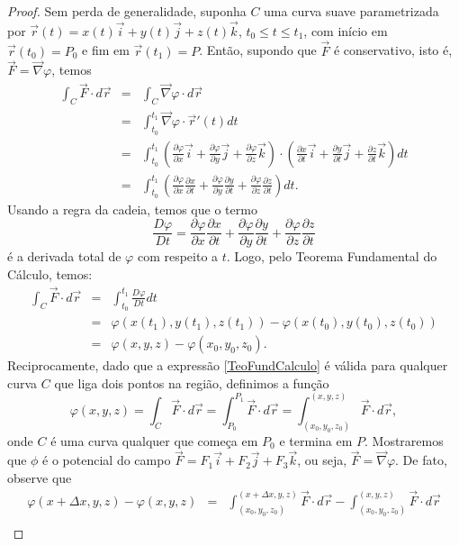 \begin{proof}
Sem perda de generalidade, suponha $C$ uma curva suave parametrizada por $\vec{r}(t)=x(t)\vec{i}+y(t)\vec{j}+z(t)\vec{k}$, $t_0\leq t\leq t_1$, com início em $\vec{r}(t_0)=P_0$ e fim em $\vec{r}(t_1)=P$. Então, supondo que $\vec{F}$ é conservativo, isto é, $\vec{F}=\vec{\nabla}\varphi$, temos
\begin{eqnarray*}
\int_C\vec{F}\cdot d \vec{r} &=& \int_C\vec{\nabla}\varphi\cdot d \vec{r}\\
&=& \int_{t_0}^{t_1}\vec{\nabla}\varphi\cdot \vec{r}'(t)dt\\
&=& \int_{t_0}^{t_1}\left(\frac{\partial\varphi}{\partial x}\vec{i}+\frac{\partial\varphi}{\partial y}\vec{j}+\frac{\partial\varphi}{\partial z}\vec{k}\right)\cdot \left(\frac{\partial x}{\partial t}\vec{i}+\frac{\partial y}{\partial t}\vec{j}+\frac{\partial z}{\partial t}\vec{k}\right) dt\\
&=& \int_{t_0}^{t_1}\left(\frac{\partial\varphi}{\partial x}\frac{\partial x}{\partial t}+\frac{\partial\varphi}{\partial y}\frac{\partial y}{\partial t}+\frac{\partial\varphi}{\partial z}\frac{\partial z}{\partial t}\right) dt.
\end{eqnarray*}
Usando a regra da cadeia, temos que o termo
$$
\frac{D\varphi}{Dt}=\frac{\partial\varphi}{\partial x}\frac{\partial x}{\partial t}+\frac{\partial\varphi}{\partial y}\frac{\partial y}{\partial t}+\frac{\partial\varphi}{\partial z}\frac{\partial z}{\partial t}
$$
é a derivada total de $\varphi$ com respeito a $t$. Logo, pelo Teorema Fundamental do Cálculo, temos:
\begin{eqnarray*}
\int_C\vec{F}\cdot d \vec{r} &=&  \int_{t_0}^{t_1}\frac{D\varphi}{Dt} dt\\
&=& \varphi(x(t_1),y(t_1),z(t_1))- \varphi(x(t_0),y(t_0),z(t_0))\\
&=& \varphi(x,y,z)- \varphi(x_0,y_0,z_0).
\end{eqnarray*}
Reciprocamente, dado que a expressão \eqref{TeoFundCalculo} é válida para qualquer curva $C$ que liga dois pontos na região, definimos a função
$$
\varphi(x,y,z)=\int_C \vec{F}\cdot d\vec{r}=\int_{P_0}^{P_1} \vec{F}\cdot d\vec{r}=\int_{(x_0,y_0,z_0)}^{(x,y,z)} \vec{F}\cdot d\vec{r},
$$
onde $C$ é uma curva qualquer que começa em $P_0$ e termina em $P$. Mostraremos que $\phi$ é o potencial do campo $\vec{F}=F_1\vec{i}+F_2\vec{j}+F_3\vec{k}$, ou seja, $\vec{F}=\vec{\nabla}\varphi$. De fato, observe que
\begin{eqnarray*}
\varphi(x+\Delta x,y,z)-\varphi(x,y,z)&=&\int_{(x_0,y_0,z_0)}^{(x+\Delta x,y,z)} \vec{F}\cdot d\vec{r}-\int_{(x_0,y_0,z_0)}^{(x,y,z)} \vec{F}\cdot d\vec{r}\\

\end{eqnarray*}
\end{proof}
